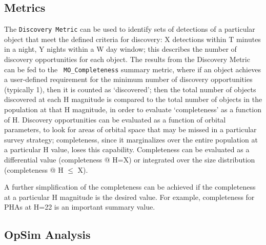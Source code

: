 
\subsection{Metrics}
\label{sec:\secname:metrics}

The {\tt Discovery Metric} can be used to identify sets of detections
of a particular object that meet the defined criteria for discovery: X
detections within T minutes in a night, Y nights within a W day
window; this describes the number of discovery opportunities for each object. The results from the Discovery Metric can be fed to the {\tt
  MO\_Completeness} summary metric, where if an object achieves a
user-defined requirement for the minimum number of discovery
opportunities (typically 1), then it is counted as `discovered'; then
the total number of objects discovered at each H magnitude is compared
to the total number of objects in the population at that H magnitude,
in order to evaluate `completeness' as a function of H. Discovery
opportunities can be evaluated as a function of orbital parameters, to
look for areas of orbital space that may be missed in a particular
survey strategy; completeness, since it marginalizes over the entire
population at a particular H value, loses this
capability. Completeness can be evaluated as a differential value
(completeness @ H=X) or integrated over the size distribution
(completeness @ H $\leq$ X).
 
A further simplification of the completeness can be achieved if the
completeness at a particular H magnitude is the desired value. For
example, completeness for PHAs at H=22 is an important summary value.


\subsection{OpSim Analysis}
\label{sec:\secname:analysis}


